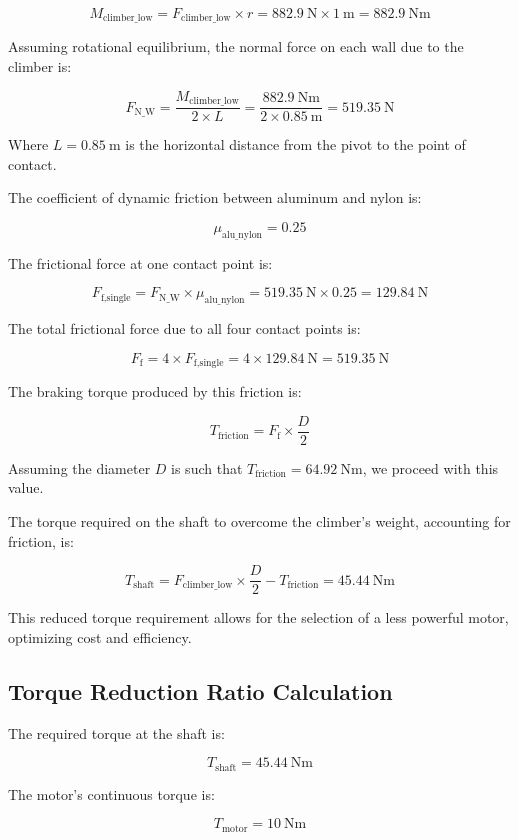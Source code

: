 \[
M_{\text{climber\_low}} = F_{\text{climber\_low}} \times r = 882.9\ \text{N} \times 1\ \text{m} = 882.9\ \text{Nm}
\]

Assuming rotational equilibrium, the normal force on each wall due to the climber is:

\[
F_{\text{N\_W}} = \frac{M_{\text{climber\_low}}}{2 \times L} = \frac{882.9\ \text{Nm}}{2 \times 0.85\ \text{m}} = 519.35\ \text{N}
\]

Where \( L = 0.85\ \text{m} \) is the horizontal distance from the pivot to the point of contact.

The coefficient of dynamic friction between aluminum and nylon is:

\[
\mu_{\text{alu\_nylon}} = 0.25
\]

The frictional force at one contact point is:

\[
F_{\text{f,single}} = F_{\text{N\_W}} \times \mu_{\text{alu\_nylon}} = 519.35\ \text{N} \times 0.25 = 129.84\ \text{N}
\]

The total frictional force due to all four contact points is:

\[
F_{\text{f}} = 4 \times F_{\text{f,single}} = 4 \times 129.84\ \text{N} = 519.35\ \text{N}
\]

The braking torque produced by this friction is:

\[
T_{\text{friction}} = F_{\text{f}} \times \frac{D}{2}
\]

Assuming the diameter \( D \) is such that \( T_{\text{friction}} = 64.92\ \text{Nm} \), we proceed with this value.

The torque required on the shaft to overcome the climber's weight, accounting for friction, is:

\[
T_{\text{shaft}} = F_{\text{climber\_low}} \times \frac{D}{2} - T_{\text{friction}} = 45.44\ \text{Nm}
\]

This reduced torque requirement allows for the selection of a less powerful motor, optimizing cost and efficiency.

\subsection*{Torque Reduction Ratio Calculation}

The required torque at the shaft is:

\[
T_{\text{shaft}} = 45.44\ \text{Nm}
\]

The motor's continuous torque is:

\[
T_{\text{motor}} = 10\ \text{Nm}
\]

